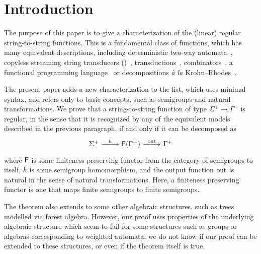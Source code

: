 \section{Introduction}
\label{sec:intro}

The purpose of this paper is to give a characterization of the (linear) regular string-to-string functions. This is a fundamental class of functions, which has many equivalent descriptions, including deterministic two-way automata~\cite[Note~4]{shepherdson1959reduction}, copyless streaming string transducers (\sst)~\cite[Section~3]{alurExpressivenessStreamingString2010}, \mso transductions~\cite[Theorem~13]{engelfrietMSODefinableString2001}, combinators~\cite[Section~2]{alur2014regular}, a functional programming language~\cite[Section~6]{bojanczykRegularFirstOrderList2018} or decompositions \textit{à la} Krohn--Rhodes~\cite[Theorem~18, item~4]{bojanczykstefanski2020}.


The present paper adds a new characterization to the list, which uses minimal syntax, and refers only to basic concepts, such as semigroups and natural transformations. We prove that a string-to-string function of type $\Sigma^+ \to \Gamma^+$ is regular, in the sense that it is recognized by any of the equivalent models described in the previous paragraph, if and only if it can be decomposed as 
\[
\begin{tikzcd}
    \Sigma^+ 
    \ar[r,"h"]
    & 
    \functor(\Gamma^+)
    \ar[r,"\outfun"]
    &
    \Gamma^+
\end{tikzcd}
\]
where $\mathsf F$ is some finiteness preserving functor from the category of semigroups to itself, $h$ is some semigroup homomorphism, and the output function $\mathrm{out}$ is natural in the sense of natural transformations. Here, a finiteness preserving functor is one that maps finite semigroups to finite semigroups. 


The theorem also extends to some other algebraic structures, such as trees modelled via forest algebra. However, our proof uses properties of the underlying algebraic structure which seem to fail for some structures such as groups or algebras corresponding to weighted automata; we do not know if our proof can be extended to  these structures, or even if the theorem itself is true.

